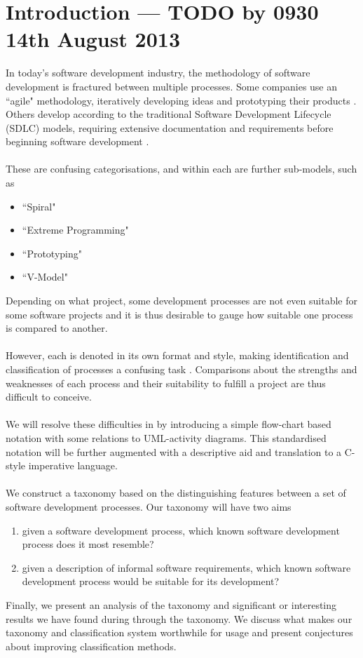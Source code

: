 \section{Introduction --- TODO by 0930 14th August 2013} \label{introduction}

In today's software development industry, the methodology of software development is fractured
between multiple processes.
Some companies use an ``agile" methodology, iteratively developing ideas and prototyping their
products \FIXME. %
Others develop according to the traditional Software Development Lifecycle (SDLC) models, requiring
extensive documentation and requirements before beginning software development \FIXME.\\
\\
These are confusing categorisations, and within each are further sub-models, such as \FIXME
\begin{itemize}
	\item ``Spiral"
	\item ``Extreme Programming"
	\item ``Prototyping"
	\item ``V-Model"
\end{itemize}
Depending on what project, some development processes are not even suitable for some software
projects and it is thus desirable to gauge how suitable one process is compared to another.\\
\\
However, each is denoted in its own format and style, making identification and classification of processes a
confusing task \FIXME. %
Comparisons about the strengths and weaknesses of each process and their suitability to fulfill a
project are thus difficult to conceive.\\
\\
We will resolve these difficulties in by introducing a simple flow-chart based notation with some
relations to UML-activity diagrams.
This standardised notation will be further augmented with a descriptive aid and translation to a
C-style imperative language.\\
\\
We construct a taxonomy based on the distinguishing features between a set of software development
processes.
Our taxonomy will have two aims
\begin{enumerate}
	\item given a software development process, which known software development process does it most
	resemble?
	\item given a description of informal software requirements, which known software development
	process would be suitable for its development?
\end{enumerate}

Finally, we present an analysis of the taxonomy and significant or interesting results we have
found during through the taxonomy.
We discuss what makes our taxonomy and classification system worthwhile for usage and present
conjectures about improving classification methods.
